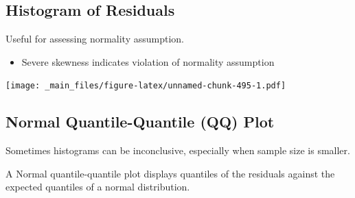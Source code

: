 \documentclass[]{book}
\newenvironment{Shaded}{\begin{snugshade}}{\end{snugshade}}
\newcommand{\KeywordTok}[1]{\textcolor[rgb]{0.13,0.29,0.53}{\textbf{#1}}}
\newcommand{\DataTypeTok}[1]{\textcolor[rgb]{0.13,0.29,0.53}{#1}}
\newcommand{\DecValTok}[1]{\textcolor[rgb]{0.00,0.00,0.81}{#1}}
\newcommand{\StringTok}[1]{\textcolor[rgb]{0.31,0.60,0.02}{#1}}
\newcommand{\OperatorTok}[1]{\textcolor[rgb]{0.81,0.36,0.00}{\textbf{#1}}}
\newcommand{\NormalTok}[1]{#1}
\providecommand{\tightlist}{%
  \setlength{\itemsep}{0pt}\setlength{\parskip}{0pt}}
\begin{document}
\subsection{Histogram of Residuals}\label{histogram-of-residuals}

Useful for assessing normality assumption.

\begin{itemize}
\tightlist
\item
  Severe skewness indicates violation of normality assumption
\end{itemize}

\begin{Shaded}
\end{Shaded}

\texttt{[image: \_main\_files/figure-latex/unnamed-chunk-495-1.pdf]}

\subsection{Normal Quantile-Quantile (QQ)
Plot}\label{normal-quantile-quantile-qq-plot}

Sometimes histograms can be inconclusive, especially when sample size is
smaller.

A Normal quantile-quantile plot displays quantiles of the residuals
against the expected quantiles of a normal distribution.
\end{document}
